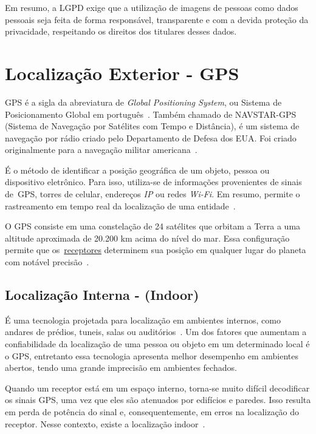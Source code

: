 \item
Em resumo, a LGPD exige que a utilização de imagens de pessoas como dados pessoais seja feita de forma responsável, transparente e com a devida proteção da privacidade, respeitando os direitos dos titulares desses dados.


\section{Localização Exterior - GPS}\label{sec:localizacao}
GPS é a sigla da abreviatura de \textit{Global Positioning System}, ou Sistema de Posicionamento Global em português~\cite{gpsdesigning}.
Também chamado de NAVSTAR-GPS (Sistema de Navegação por Satélites com Tempo e Distância), é um sistema de navegação por rádio criado pelo Departamento de Defesa dos EUA. Foi criado originalmente para a navegação militar americana~\cite{novais2014localizaccao}.

É o método de identificar a posição geográfica de um objeto, pessoa ou dispositivo eletrônico.
Para isso, utiliza-se de informações provenientes de sinais de~\hypertarget{receptores}{GPS, torres de celular, endereços \textit{IP} ou redes  \textit{Wi-Fi}}.
Em resumo, permite o rastreamento em tempo real da localização de uma entidade~\cite{da2019sistemas}.

O GPS consiste em uma constelação de 24 satélites que orbitam a Terra a uma altitude aproximada de 20.200 km acima do nível do mar.
Essa configuração permite que os~\hyperlink{receptores}{receptores} determinem sua posição em qualquer lugar do planeta com notável precisão~\cite{el2002introduction}.

\subsection{Localização Interna - (Indoor)}\label{subsec:localizacao-indoor}

É uma tecnologia projetada para localização em ambientes internos, como andares de prédios, tuneis, salas ou auditórios~\cite{mittelstadt2018bluepath}.
Um dos fatores que aumentam a confiabilidade da localização de uma pessoa ou objeto em um determinado local é o GPS, entretanto essa tecnologia apresenta melhor desempenho em ambientes abertos, tendo uma grande imprecisão em ambientes fechados.

Quando um receptor está em um espaço interno, torna-se muito difícil decodificar os sinais GPS, uma vez que eles são atenuados por edifícios e paredes.
Isso resulta em perda de potência do sinal e, consequentemente, em erros na localização do receptor.
Nesse contexto, existe a localização indoor~\cite{mittelstadt2018bluepath}.

